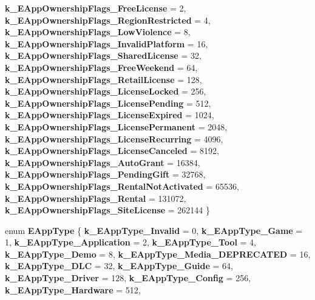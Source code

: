 \begin{DoxyCompactItemize}
{\bfseries k\+\_\+\+E\+App\+Ownership\+Flags\+\_\+\+Free\+License} = 2, 
{\bfseries k\+\_\+\+E\+App\+Ownership\+Flags\+\_\+\+Region\+Restricted} = 4, 
\newline
{\bfseries k\+\_\+\+E\+App\+Ownership\+Flags\+\_\+\+Low\+Violence} = 8, 
{\bfseries k\+\_\+\+E\+App\+Ownership\+Flags\+\_\+\+Invalid\+Platform} = 16, 
{\bfseries k\+\_\+\+E\+App\+Ownership\+Flags\+\_\+\+Shared\+License} = 32, 
{\bfseries k\+\_\+\+E\+App\+Ownership\+Flags\+\_\+\+Free\+Weekend} = 64, 
\newline
{\bfseries k\+\_\+\+E\+App\+Ownership\+Flags\+\_\+\+Retail\+License} = 128, 
{\bfseries k\+\_\+\+E\+App\+Ownership\+Flags\+\_\+\+License\+Locked} = 256, 
{\bfseries k\+\_\+\+E\+App\+Ownership\+Flags\+\_\+\+License\+Pending} = 512, 
{\bfseries k\+\_\+\+E\+App\+Ownership\+Flags\+\_\+\+License\+Expired} = 1024, 
\newline
{\bfseries k\+\_\+\+E\+App\+Ownership\+Flags\+\_\+\+License\+Permanent} = 2048, 
{\bfseries k\+\_\+\+E\+App\+Ownership\+Flags\+\_\+\+License\+Recurring} = 4096, 
{\bfseries k\+\_\+\+E\+App\+Ownership\+Flags\+\_\+\+License\+Canceled} = 8192, 
{\bfseries k\+\_\+\+E\+App\+Ownership\+Flags\+\_\+\+Auto\+Grant} = 16384, 
\newline
{\bfseries k\+\_\+\+E\+App\+Ownership\+Flags\+\_\+\+Pending\+Gift} = 32768, 
{\bfseries k\+\_\+\+E\+App\+Ownership\+Flags\+\_\+\+Rental\+Not\+Activated} = 65536, 
{\bfseries k\+\_\+\+E\+App\+Ownership\+Flags\+\_\+\+Rental} = 131072, 
{\bfseries k\+\_\+\+E\+App\+Ownership\+Flags\+\_\+\+Site\+License} = 262144
 \}
\item 
\mbox{\label{namespace_valve_1_1_steamworks_a72bce558a41a1351db9b5dfba7600956}} 
enum {\bfseries E\+App\+Type} \{ \newline
{\bfseries k\+\_\+\+E\+App\+Type\+\_\+\+Invalid} = 0, 
{\bfseries k\+\_\+\+E\+App\+Type\+\_\+\+Game} = 1, 
{\bfseries k\+\_\+\+E\+App\+Type\+\_\+\+Application} = 2, 
{\bfseries k\+\_\+\+E\+App\+Type\+\_\+\+Tool} = 4, 
\newline
{\bfseries k\+\_\+\+E\+App\+Type\+\_\+\+Demo} = 8, 
{\bfseries k\+\_\+\+E\+App\+Type\+\_\+\+Media\+\_\+\+D\+E\+P\+R\+E\+C\+A\+T\+ED} = 16, 
{\bfseries k\+\_\+\+E\+App\+Type\+\_\+\+D\+LC} = 32, 
{\bfseries k\+\_\+\+E\+App\+Type\+\_\+\+Guide} = 64, 
\newline
{\bfseries k\+\_\+\+E\+App\+Type\+\_\+\+Driver} = 128, 
{\bfseries k\+\_\+\+E\+App\+Type\+\_\+\+Config} = 256, 
{\bfseries k\+\_\+\+E\+App\+Type\+\_\+\+Hardware} = 512, 

\end{DoxyCompactItemize}
